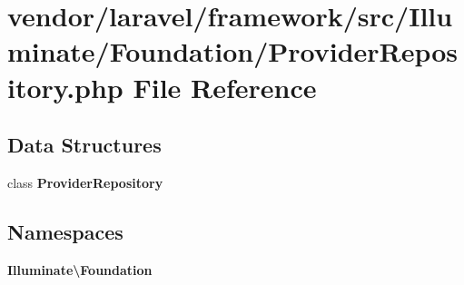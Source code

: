 \section{vendor/laravel/framework/src/\+Illuminate/\+Foundation/\+Provider\+Repository.php File Reference}
\label{_provider_repository_8php}
\subsection*{Data Structures}
\begin{DoxyCompactItemize}
\item 
class {\bf Provider\+Repository}
\end{DoxyCompactItemize}
\subsection*{Namespaces}
\begin{DoxyCompactItemize}
\item 
 {\bf Illuminate\textbackslash{}\+Foundation}
\end{DoxyCompactItemize}
